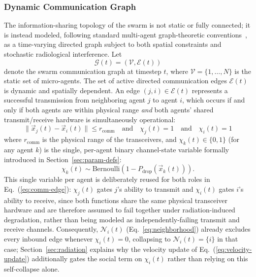 \documentclass[journal]{IEEEtran}
\begin{document}
\subsubsection{Dynamic Communication Graph}
\label{sec:comm-graph}

The information-sharing topology of the swarm is not static or fully connected; it is instead modeled, following standard multi-agent graph-theoretic conventions~\cite{decentralized_graphs}, as a time-varying directed graph subject to both spatial constraints and stochastic radiological interference. Let
\begin{equation}
\mathcal{G}(t) = \left(\mathcal{V}, \mathcal{E}(t)\right)
\end{equation}
denote the swarm communication graph at timestep $t$, where $\mathcal{V} = \{1, \dots, N\}$ is the static set of micro-agents. The set of active directed communication edges $\mathcal{E}(t)$ is dynamic and spatially dependent. An edge $(j,i) \in \mathcal{E}(t)$ represents a successful transmission from neighboring agent $j$ to agent $i$, which occurs if and only if both agents are within physical range \emph{and} both agents' shared transmit/receive hardware is simultaneously operational:
\begin{equation}
\|\vec{x}_j(t) - \vec{x}_i(t)\| \le r_{\text{comm}} \quad \text{and} \quad \chi_j(t) = 1 \quad \text{and} \quad \chi_i(t) = 1
\label{eq:comm-edge}
\end{equation}
where $r_{\text{comm}}$ is the physical range of the transceivers, and $\chi_k(t) \in \{0,1\}$ (for any agent $k$) is the single, per-agent binary channel-state variable formally introduced in Section~\ref{sec:param-defs}:
\begin{equation}
\chi_k(t) \sim \text{Bernoulli}\left(1 - P_{\text{drop}}(\vec{x}_k(t))\right).
\end{equation}
This single variable per agent is deliberately reused for both roles in Eq.~(\ref{eq:comm-edge}): $\chi_j(t)$ gates $j$'s ability to transmit and $\chi_i(t)$ gates $i$'s ability to receive, since both functions share the same physical transceiver hardware and are therefore assumed to fail together under radiation-induced degradation, rather than being modeled as independently-failing transmit and receive channels. Consequently, $\mathcal{N}_i(t)$ (Eq.~\ref{eq:neighborhood}) already excludes every inbound edge whenever $\chi_i(t)=0$, collapsing to $\mathcal{N}_i(t) = \{i\}$ in that case; Section~\ref{sec:radiation} explains why the velocity update of Eq.~(\ref{eq:velocity-update}) additionally gates the social term on $\chi_i(t)$ rather than relying on this self-collapse alone.
\end{document}
